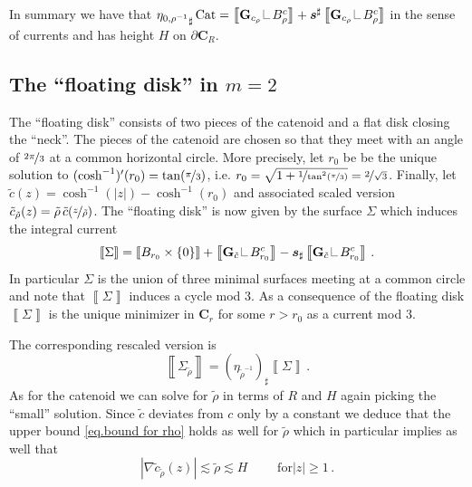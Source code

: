 \documentclass[reqno]{amsart}
\theoremstyle{definition}
\theoremstyle{remark}
\numberwithin{equation}{section}
\newcommand\res{\mathop{\hbox{\vrule height 7pt width .3pt depth 0pt\vrule height .3pt width 5pt depth 0pt}}\nolimits}
\newcommand{\bC}{\mathbf{C}} %
\newcommand{\bG}{\mathbf{G}} %
\def\a#1{\left\llbracket{#1}\right\rrbracket}
\begin{document}
In summary we have that ${\eta_{0,\rho^{-1}}}_\sharp \operatorname{Cat}= \a{\bG_{c_{\rho}}\res B_{\rho}^c}+ \boldsymbol{s}^\sharp \a{\bG_{c_{\rho}}\res B_{\rho}^c}$ in the sense of currents and has height $H$ on $\partial \bC_R$.

\subsection{The ``floating disk'' in $m=2$}\label{subsec.floating disk m=2}
The ``floating disk'' consists of two pieces of the catenoid and a flat disk closing the ``neck''. The pieces of the catenoid are chosen so that they meet with an angle of $\nicefrac{2\pi}{3}$ at a common horizontal circle. 
More precisely, let $r_0$ be be the unique solution to $(\cosh^{-1})'(r_0)=\tan(\nicefrac{\pi}{3})$, i.e. $r_0=\sqrt{1+\nicefrac{1}{\tan^2(\nicefrac{\pi}{3})}}=\nicefrac{2}{\sqrt{3}}$. Finally, let $\tilde{c}(z)=\cosh^{-1}(|z|)-\cosh^{-1}(r_0)$ and associated scaled version $\tilde{c}_{\tilde{\rho}}(z) = \tilde{\rho}\, \tilde{c}(\nicefrac{z}{\tilde{\rho}})$. The ``floating disk'' is now given by the surface $\Sigma$ which induces the integral current 
\[  \a{\Sigma} = \a{B_{r_0}\times \{0\}}+ \a{\bG_{\tilde{c}}\res B_{r_0}^c} - \boldsymbol{s}_\sharp\a{\bG_{\tilde{c}}\res B_{r_0}^c}\, .\]
 In particular $\Sigma$ is the union of three minimal surfaces meeting at a common circle and note that $\a{\Sigma}$ induces a cycle mod $3$. As a consequence of \cite[Proposition 1.8]{DHMSS} the floating disk $\a{\Sigma}$ is the unique minimizer in $\bC_r$ for some $r>r_0$ as a current mod $3$. 

The corresponding rescaled version is
\[  \a{\Sigma_{\tilde{\rho}}} = (\eta_{{\tilde{\rho}}^{-1}})_\sharp \a{\Sigma}\, .\]
As for the catenoid we can solve for $\tilde{\rho}$ in terms of $R$ and $H$ again picking the ``small'' solution. Since $\tilde{c}$ deviates from $c$ only by a constant we deduce that the upper bound \eqref{eq.bound for rho} holds as well for $\tilde{\rho}$ which in particular implies as well that 
\begin{equation}\label{eq.derivative floating disc}
    |\nabla \tilde{c}_{\tilde{\rho}}(z)|\lesssim \tilde{\rho} \lesssim H\qquad\text{ for} |z|\ge 1\,.
\end{equation}
\end{document}
